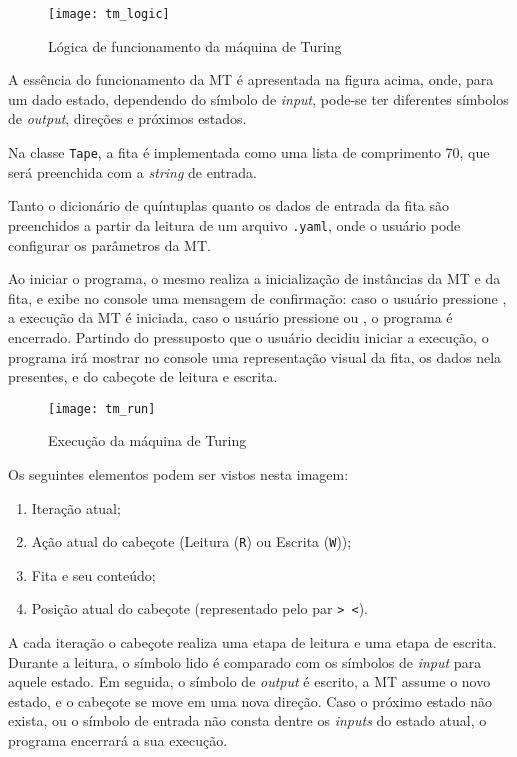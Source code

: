 \begin{figure}[H]
    \centering
    \texttt{[image: tm\_logic]}
    \label{tm_logic}
    \caption{Lógica de funcionamento da máquina de Turing}
\end{figure}

A essência do funcionamento da MT é apresentada na figura acima, onde, para um
dado estado, dependendo do símbolo de \textit{input}, pode-se ter diferentes
símbolos de \textit{output}, direções e próximos estados.

Na classe \verb|Tape|, a fita é implementada como uma lista de comprimento 70,
que será preenchida com a \textit{string} de entrada.

Tanto o dicionário de quíntuplas quanto os dados de entrada da fita são
preenchidos a partir da leitura de um arquivo \verb|.yaml|, onde o usuário pode
configurar os parâmetros da MT.

Ao iniciar o programa, o mesmo realiza a inicialização de instâncias da MT e da
fita, e exibe no console uma mensagem de confirmação: caso o usuário pressione
\keys{\enter}, a execução da MT é iniciada, caso o usuário pressione
\linebreak {} ou , o programa é encerrado. Partindo do
pressuposto que o usuário decidiu iniciar a execução, o programa irá mostrar no
console uma representação visual da fita, os dados nela presentes, e do cabeçote
de leitura e escrita.

\begin{figure}[H]
    \centering
    \texttt{[image: tm\_run]}
    \label{tm_run}
    \caption{Execução da máquina de Turing}
\end{figure}

Os seguintes elementos podem ser vistos nesta imagem:

\begin{enumerate}
    \item Iteração atual;
    \item Ação atual do cabeçote (Leitura (\verb|R|) ou Escrita (\verb|W|));
    \item Fita e seu conteúdo;
    \item Posição atual do cabeçote (representado pelo par \verb|> <|).
\end{enumerate}

A cada iteração o cabeçote realiza uma etapa de leitura e uma etapa de escrita.
Durante a leitura, o símbolo lido é comparado com os símbolos de \textit{input}
para aquele estado. Em seguida, o símbolo de \textit{output} é escrito, a MT
assume o novo estado, e o cabeçote se move em uma nova direção. Caso o próximo
estado não exista, ou o símbolo de entrada não consta dentre os \textit{inputs}
do estado atual, o programa encerrará a sua execução.

